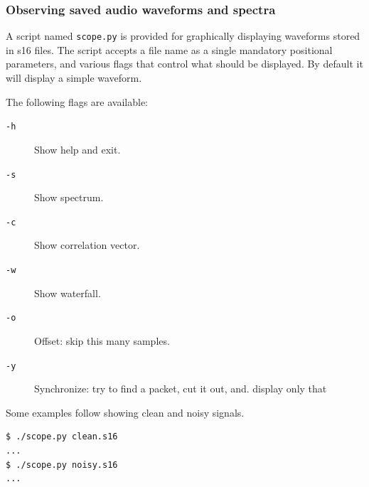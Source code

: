 \documentclass[a4paper]{article}
\begin{document}
\subsubsection{Observing saved audio waveforms and spectra}

A script named \texttt{scope.py} is provided for graphically displaying 
waveforms stored in s16 files. The script accepts a file name as a 
single mandatory positional parameters, and various flags that control 
what should be displayed. By default it will display a simple waveform.

The following flags are available:

\begin{description}
\item[\texttt{-h}] Show help and exit.
\item[\texttt{-s}] Show spectrum.
\item[\texttt{-c}] Show correlation vector.
\item[\texttt{-w}] Show waterfall.
\item[\texttt{-o}] Offset: skip this many samples.
\item[\texttt{-y}] Synchronize: try to find a packet, cut it out, and.
  display only that
\end{description}

Some examples follow showing clean and noisy signals.

\begin{lstlisting}
$ ./scope.py clean.s16
...
$ ./scope.py noisy.s16
...
\end{lstlisting}
\end{document}
